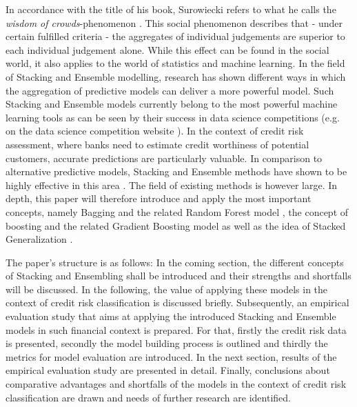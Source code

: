 \documentclass[12pt]{article}
\begin{document}
\noindent In accordance with the title of his book, Surowiecki refers to what he calls the \textit{wisdom of crowds}-phenomenon \citep{surowiecki2005wisdom}. This social phenomenon describes that - under certain fulfilled criteria - the aggregates of individual judgements are superior to each individual judgement alone. While this effect can be found in the social world, it also applies to the world of statistics and machine learning. In the field of Stacking and Ensemble modelling, research has shown different ways in which the aggregation of predictive models can deliver a more powerful model. Such Stacking and Ensemble models currently belong to the most powerful machine learning tools as can be seen by their success in data science competitions (e.g. on the data science competition website \citeauthor{kaggle}). In the context of credit risk assessment, where banks need to estimate credit worthiness of potential customers, accurate predictions are particularly valuable. In comparison to alternative predictive models, Stacking and Ensemble methods have shown to be highly effective in this area \citep{yu2008credit, zhu2017comparison}. The field of existing methods is however large. In depth, this paper will therefore introduce and apply the most important concepts, namely Bagging and the related Random Forest model \citep{breiman1996bagging, breiman2001random}, the concept of boosting and the related Gradient Boosting model \cite{freund1996experiments, friedman2002stochastic} as well as the idea of Stacked Generalization \citep{wolpert1992stacked}. 

The paper's structure is as follows: In the coming section, the different concepts of Stacking and Ensembling shall be introduced and their strengths and shortfalls will be discussed. In the following, the value of applying these models in the context of credit risk classification is discussed briefly. Subsequently, an empirical evaluation study that aims at applying the introduced Stacking and Ensemble models in such financial context is prepared. For that, firstly the credit risk data is presented, secondly the model building process is outlined and thirdly the metrics for model evaluation are introduced. In the next section, results of the empirical evaluation study are presented in detail. Finally, conclusions about comparative advantages and shortfalls of the models in the context of credit risk classification are drawn and needs of further research are identified.

\end{document}
